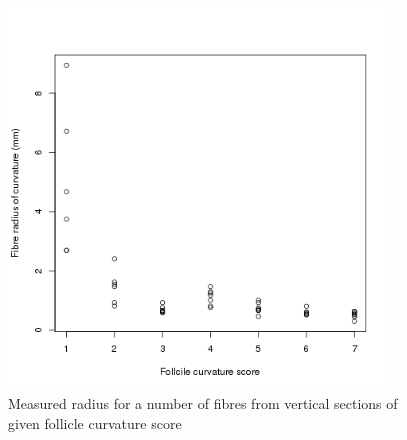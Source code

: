%

\begin{figure}[!h]
  \centering
   \includegraphics[width=0.9\textwidth]{fig2.png}
  \caption{Measured radius for a number of fibres from  vertical sections of given follicle curvature score}
  \label{rawdata}
\end{figure}

%


